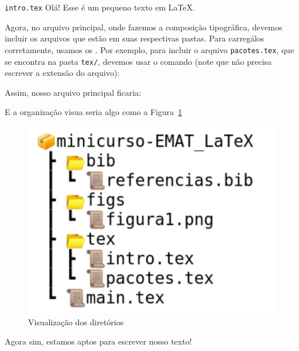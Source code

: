 \begin{codigo}{\texttt{intro.tex}}{\lapis}
Olá! Esse é um pequeno texto em \LaTeX.
\end{codigo}

Agora, no arquivo principal, onde fazemos a composição tipográfica, devemos incluir 
os arquivos que estão em suas respectivas pastas.
Para carregálos corretamente, usamos os {}.
Por exemplo, para incluir o arquivo \texttt{pacotes.tex}, que se encontra na pasta 
\texttt{tex/}, devemos usar o comando (note que não precisa escrever a extensão 
do arquivo):\\


Assim, nosso arquivo principal ficaria:


E a organização visua seria algo como a Figura~\ref{fig:diretorios}

\begin{figure}[!htbp]
  \centering
  \includegraphics[width=0.45\linewidth]{diretorios}
  \caption{Visualização dos diretórios}
  \label{fig:diretorios}  
\end{figure}

Agora sim, estamos aptos para escrever nosso texto!